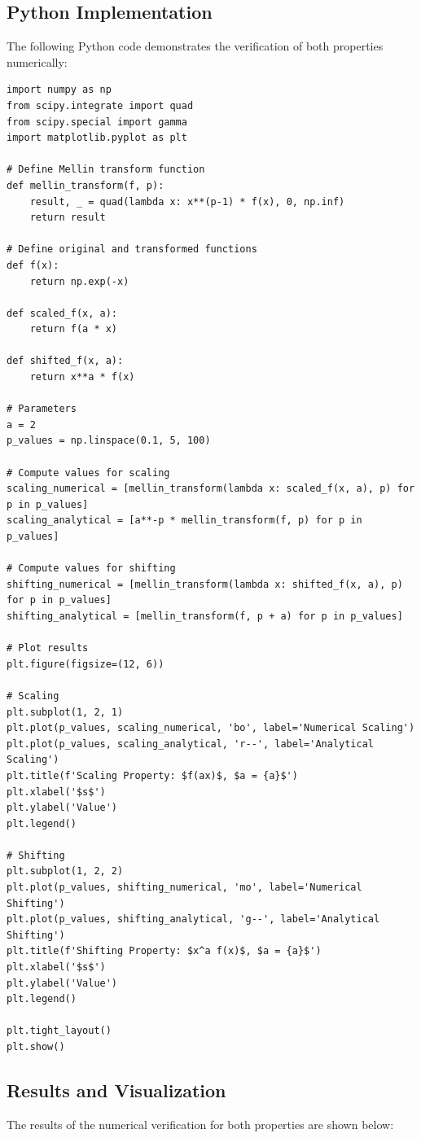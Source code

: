 \documentclass[a4paper, 12pt]{article}
\begin{document}
\subsection{Python Implementation}
The following Python code demonstrates the verification of both properties numerically:
\begin{lstlisting}[style=pythonstyle]
import numpy as np
from scipy.integrate import quad
from scipy.special import gamma
import matplotlib.pyplot as plt

# Define Mellin transform function
def mellin_transform(f, p):
    result, _ = quad(lambda x: x**(p-1) * f(x), 0, np.inf)
    return result

# Define original and transformed functions
def f(x):
    return np.exp(-x)

def scaled_f(x, a):
    return f(a * x)

def shifted_f(x, a):
    return x**a * f(x)

# Parameters
a = 2
p_values = np.linspace(0.1, 5, 100)

# Compute values for scaling
scaling_numerical = [mellin_transform(lambda x: scaled_f(x, a), p) for p in p_values]
scaling_analytical = [a**-p * mellin_transform(f, p) for p in p_values]

# Compute values for shifting
shifting_numerical = [mellin_transform(lambda x: shifted_f(x, a), p) for p in p_values]
shifting_analytical = [mellin_transform(f, p + a) for p in p_values]

# Plot results
plt.figure(figsize=(12, 6))

# Scaling
plt.subplot(1, 2, 1)
plt.plot(p_values, scaling_numerical, 'bo', label='Numerical Scaling')
plt.plot(p_values, scaling_analytical, 'r--', label='Analytical Scaling')
plt.title(f'Scaling Property: $f(ax)$, $a = {a}$')
plt.xlabel('$s$')
plt.ylabel('Value')
plt.legend()

# Shifting
plt.subplot(1, 2, 2)
plt.plot(p_values, shifting_numerical, 'mo', label='Numerical Shifting')
plt.plot(p_values, shifting_analytical, 'g--', label='Analytical Shifting')
plt.title(f'Shifting Property: $x^a f(x)$, $a = {a}$')
plt.xlabel('$s$')
plt.ylabel('Value')
plt.legend()

plt.tight_layout()
plt.show()
\end{lstlisting}

\subsection{Results and Visualization}
The results of the numerical verification for both properties are shown below:
\end{document}
